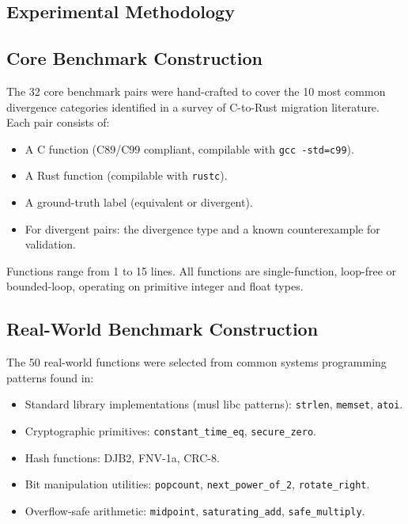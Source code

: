 \documentclass[11pt,a4paper]{article}
\begin{document}
\begin{appendices}
\section{Experimental Methodology}\label{app:methodology}

\subsection{Core Benchmark Construction}

The 32 core benchmark pairs were hand-crafted to cover the 10 most
common divergence categories identified in a survey of C-to-Rust
migration literature.  Each pair consists of:
\begin{itemize}
  \item A C function (C89/C99 compliant, compilable with \texttt{gcc -std=c99}).
  \item A Rust function (compilable with \texttt{rustc}).
  \item A ground-truth label (equivalent or divergent).
  \item For divergent pairs: the divergence type and a known
    counterexample for validation.
\end{itemize}

Functions range from 1 to 15 lines.  All functions are single-function,
loop-free or bounded-loop, operating on primitive integer and float types.

\subsection{Real-World Benchmark Construction}

The 50 real-world functions were selected from common systems programming
patterns found in:
\begin{itemize}
  \item Standard library implementations (musl libc patterns):
    \texttt{strlen}, \texttt{memset}, \texttt{atoi}.
  \item Cryptographic primitives: \texttt{constant\_time\_eq},
    \texttt{secure\_zero}.
  \item Hash functions: DJB2, FNV-1a, CRC-8.
  \item Bit manipulation utilities: \texttt{popcount},
    \texttt{next\_power\_of\_2}, \texttt{rotate\_right}.
  \item Overflow-safe arithmetic: \texttt{midpoint},
    \texttt{saturating\_add}, \texttt{safe\_multiply}.
\end{itemize}


\end{appendices}
\end{document}
